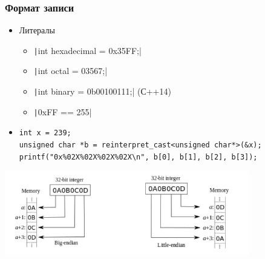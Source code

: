 \documentclass[xetex,mathserif,serif]{beamer}
\begin{document}
	\begin{frame}[fragile]
		\frametitle{Формат записи}
		\begin{itemize}
			\item Литералы
			\begin{itemize}
				\item \texttt|int hexadecimal = 0x35FF;|
				\item \texttt|int octal = 03567;|
				\item \texttt|int binary = 0b00100111;| (С++14) 
				\item \texttt|0xFF == 255|
			\end{itemize}
			\item 
			\begin{footnotesize}
				\begin{verbatim}
int x = 239;
unsigned char *b = reinterpret_cast<unsigned char*>(&x);
printf("0x%02X%02X%02X%02X\n", b[0], b[1], b[2], b[3]);
				\end{verbatim}
			\end{footnotesize}
		\end{itemize}
		\begin{center}
			\includegraphics[width=0.8\textwidth]{little-endian-big-endian.png}
		\end{center}
	\end{frame}
\end{document}
